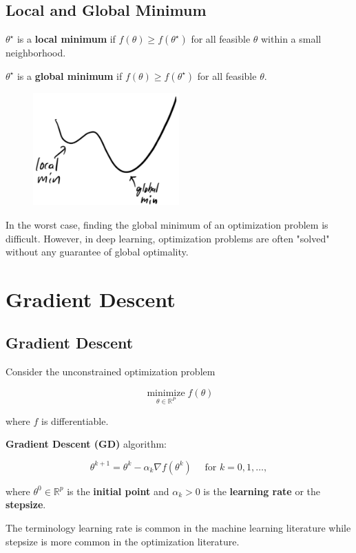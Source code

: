 \documentclass{report}
\begin{document}
\section{Local and Global Minimum}

\begin{definition}
    $\theta^{\star}$ is a \textbf{local minimum} if $f(\theta) \geq f\left(\theta^{\star}\right)$ for all feasible $\theta$ within a small neighborhood.

    $\theta^{\star}$ is a \textbf{global minimum} if $f(\theta) \geq f\left(\theta^{\star}\right)$ for all feasible $\theta$.

    \begin{figure}[H]
        \centering
        \includegraphics[width=0.5\textwidth]{.././assets/1.1.jpg}
    \end{figure}

    In the worst case, finding the global minimum of an optimization problem is difficult.
    However, in deep learning, optimization problems are often "solved" without any guarantee of global optimality.
\end{definition}

\chapter{Gradient Descent}

\section{Gradient Descent}

\begin{definition}
    Consider the unconstrained optimization problem

    $$
    \underset{\theta \in \mathbb{R}^{P}}{\operatorname{minimize}} f(\theta)
    $$

    where $f$ is differentiable.

    \textbf{Gradient Descent (GD)} algorithm:

    $$
    \theta^{k+1}=\theta^{k}-\alpha_{k} \nabla f\left(\theta^{k}\right) \quad \text { for } k=0,1, \ldots,
    $$

    where $\theta^{0} \in \mathbb{R}^{p}$ is the \textbf{initial point} and $\alpha_{k}>0$ is the \textbf{learning rate} or the \textbf{stepsize}.

    The terminology learning rate is common in the machine learning literature while stepsize is more common in the optimization literature.
\end{definition}
\end{document}
